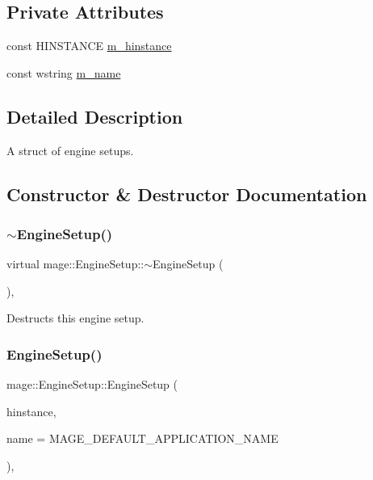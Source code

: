 \subsection*{Private Attributes}
\begin{DoxyCompactItemize}
\item 
const H\+I\+N\+S\+T\+A\+N\+CE \hyperlink{structmage_1_1_engine_setup_a678360078479bc3fee6bed4617caebbf}{m\+\_\+hinstance}
\item 
const wstring \hyperlink{structmage_1_1_engine_setup_a40fba981d4b1c30eff304b029a013009}{m\+\_\+name}
\end{DoxyCompactItemize}


\subsection{Detailed Description}
A struct of engine setups. 

\subsection{Constructor \& Destructor Documentation}
\hypertarget{structmage_1_1_engine_setup_a77de1ad7e922dec4791b558d20616b08}{}\label{structmage_1_1_engine_setup_a77de1ad7e922dec4791b558d20616b08} 
\subsubsection{\texorpdfstring{$\sim$\+Engine\+Setup()}{~EngineSetup()}}
{\footnotesize\ttfamily virtual mage\+::\+Engine\+Setup\+::$\sim$\+Engine\+Setup (\begin{DoxyParamCaption}{ }\end{DoxyParamCaption})\hspace{0.3cm}{\ttfamily [virtual]}, {\ttfamily [default]}}

Destructs this engine setup. \hypertarget{structmage_1_1_engine_setup_ac09a572abaf5f785004bb46a1d1bf49c}{}\label{structmage_1_1_engine_setup_ac09a572abaf5f785004bb46a1d1bf49c} 
\subsubsection{\texorpdfstring{Engine\+Setup()}{EngineSetup()}\hspace{0.1cm}{\footnotesize\ttfamily [1/3]}}
{\footnotesize\ttfamily mage\+::\+Engine\+Setup\+::\+Engine\+Setup (\begin{DoxyParamCaption}\item[{H\+I\+N\+S\+T\+A\+N\+CE}]{hinstance,  }\item[{const wstring \&}]{name = {\ttfamily MAGE\+\_\+DEFAULT\+\_\+APPLICATION\+\_\+NAME} }\end{DoxyParamCaption})\hspace{0.3cm}{\ttfamily [explicit]}, {\ttfamily [protected]}}

